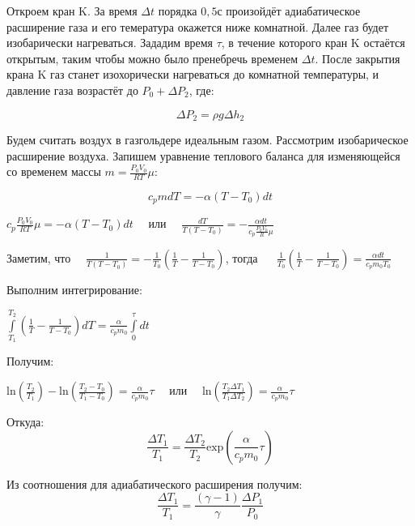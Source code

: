 \documentclass[a4paper,12pt]{article}
\begin{document}
Откроем кран $\text{K}$. За время $\Delta t$ порядка $0,5 с$ произойдёт адиабатическое расширение газа и его темература окажется ниже комнатной. Далее газ будет изобарически нагреваться. Зададим время $\tau$, в течение которого кран $\text{K}$ остаётся открытым, таким чтобы можно было пренебречь временем $\Delta t$.
После закрытия крана $\text{K}$ газ станет изохорически нагреваться до комнатной температуры, и давление газа возрастёт до $P_0 + \Delta P_2$, где:

\begin{equation}
    \Delta P_2 = \rho g \Delta h_2
\end{equation}

Будем считать воздух в газгольдере идеальным газом. Рассмотрим изобарическое расширение воздуха. Запишем уравнение теплового баланса для изменяющейся со временем массы $m=\frac{P_0 V_0}{RT}\mu$:

\begin{equation}
    c_p m dT = -\alpha (T-T_0)dt
\end{equation}

\begin{center}
    $c_p\frac{P_0 V_0}{RT}\mu = -\alpha (T-T_0)dt$  ~~или~~   $\frac{dT}{T(T-T_0)}=-\frac{\alpha dt}{c_p \frac{P_0 V_0}{R}\mu}$
\end{center}

Заметим, что~~  $\frac{1}{T(T-T_0)} = -\frac{1}{T_0}(\frac{1}{T}-\frac{1}{T-T_0})$, тогда ~~ $\frac{1}{T_0}(\frac{1}{T}-\frac{1}{T-T_0})=\frac{\alpha dt}{c_p m_0 T_0}$ \\
\par Выполним интегрирование:
\begin{center}
    $\int \limits^{T_2}_{T_1}(\frac{1}{T}-\frac{1}{T-T_0}) dT = \frac{\alpha}{c_p m_0}\int \limits^{\tau}_{0}dt$
\end{center}

Получим:

\begin{center}
    $\text{ln}(\frac{T_2}{T_1}) - \text{ln}(\frac{T_2 - T_0}{T_1 - T_0})=\frac{\alpha}{c_p m_0}\tau$ ~~или~~ $\text{ln}(\frac{T_2 \Delta T_1}{T_1 \Delta T_2})=\frac{\alpha}{c_p m_0}\tau$
\end{center}

Откуда:
\begin{equation}
    \frac{\Delta T_1}{T_1}=\frac{\Delta T_2}{T_2}\text{exp}(\frac{\alpha}{c_p m_0}\tau)
\end{equation}

Из соотношения для адиабатического расширения получим:
\begin{equation}
    \frac{\Delta T_1}{T_1}=\frac{(\gamma - 1)}{\gamma} \frac{\Delta P_1}{P_0}
\end{equation}
\end{document}
